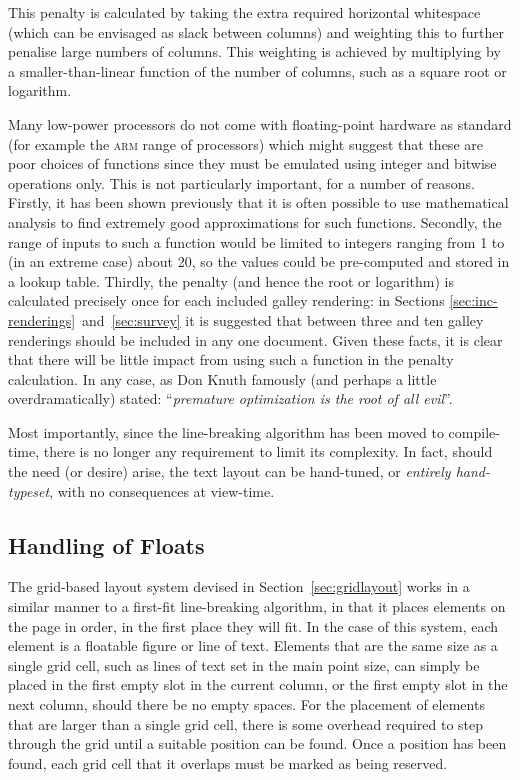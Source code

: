 This penalty is calculated by taking the extra required horizontal whitespace (which can be envisaged as slack between columns) and weighting this to further penalise large numbers of columns. This weighting is achieved by multiplying by a smaller-than-linear function of the number of columns, such as a square root or logarithm.

Many low-power processors do not come with floating-point hardware as standard (for example the \textsc{arm} range of processors) which might suggest that these are poor choices of functions since they must be emulated using integer and bitwise operations only. This is not particularly important, for a number of reasons. Firstly, it has been shown previously\hspace{0pt}\cite{Lomont2003} that it is often possible to use mathematical analysis to find extremely good approximations for such functions. Secondly, the range of inputs to such a function would be limited to integers ranging from 1 to (in an extreme case) about 20, so the values could be pre-computed and stored in a lookup table. Thirdly, the penalty (and hence the root or logarithm) is calculated precisely once for each included galley rendering: in Sections \ref{sec:inc-renderings}~and~\ref{sec:survey} it is suggested that between three and ten galley renderings should be included in any one document. Given these facts, it is clear that there will be little impact from using such a function in the penalty calculation. In any case, as Don Knuth famously (and perhaps a little overdramatically) stated: ``\emph{premature optimization is the root of all evil}''.\hspace{0pt}\cite{Knuth1974}


Most importantly, since the line-breaking algorithm has been moved to compile-time, there is no longer any requirement to limit its complexity. In fact, should the need (or desire) arise, the text layout can be hand-tuned, or \emph{entirely hand-typeset}, with no consequences at view-time.


\subsection{Handling of Floats}
\label{sec:quant-floats}

The grid-based layout system devised in Section~\ref{sec:gridlayout} works in a similar manner to a first-fit line-breaking algorithm, in that it places elements on the page in order, in the first place they will fit. In the case of this system, each element is a floatable figure or line of text. Elements that are the same size as a single grid cell, such as lines of text set in the main point size, can simply be placed in the first empty slot in the current column, or the first empty slot in the next column, should there be no empty spaces.  For the placement of elements that are larger than a single grid cell, there is some overhead required to step through the grid until a suitable position can be found. Once a position has been found, each grid cell that it overlaps must be marked as being reserved.

